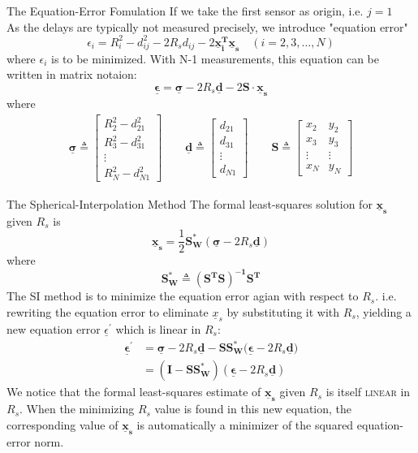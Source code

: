 \documentclass[10pt]{beamer}
\begin{document}
\begin{frame}{The Equation-Error Fomulation}
  If we take the first sensor as origin, i.e. $j=1$ \\
  As the delays are typically not measured precisely, we introduce "equation error"
  $$ \epsilon_{i} = R_{i}^2 - d_{ij}^2 -2R_{s}d_{ij} - 2\mathbf{\underline{x}_{i}^T \underline{x}_{s}} \quad (i=2,3,\ldots,N) $$
  where $\epsilon_{i}$ is to be minimized.
  With N-1 measurements, this equation can be written in matrix notaion:
  $$ \boldsymbol{\underline{\epsilon}} = \boldsymbol{\underline{\sigma}} - 2R_{s}\mathbf{\underline{d}} - 2 \mathbf{ S \cdot \underline{x}_{s}} $$
  where
  \begin{align*}
    \boldsymbol{\underline{\sigma}} \triangleq \begin{bmatrix} R_{2}^2 - d_{21}^2 \\ R_{3}^2 - d_{31}^2 \\ \vdots \\ R_{N}^2 - d_{N1}^2 \end{bmatrix} \qquad
    \mathbf{\underline{d}}      \triangleq \begin{bmatrix} d_{21}\\ d_{31} \\ \vdots \\ d_{N1} \end{bmatrix} \qquad
    \mathbf{S} \triangleq \begin{bmatrix} x_2 & y_2 \\x_3 & y_3\\ \vdots & \vdots \\ x_N & y_N \end{bmatrix}
  \end{align*}
\end{frame}
\begin{frame}{The Spherical-Interpolation Method}
  The formal least-squares solution for $\mathbf{\underline{x}_s}$ \alert{given} $R_s$ is
  $$ \mathbf{\underline{x}_s }= \frac{1}{2} \mathbf{S_W^*} (\boldsymbol{\underline{\sigma}} - 2R_s\mathbf{\underline{d}})$$
  where
  $$  \mathbf{S_W^* \triangleq (S^T S)^{-1}S^T} $$
  The \alert{SI} method is to minimize the equation error agian with respect to $R_s$.
  i.e. rewriting the equation error to eliminate $\underline{x}_s$ by substituting it with $R_s$, yielding a new equation error $\underline{\epsilon}^{'}$ which is linear in $R_s$:
  \begin{align*}
   \boldsymbol{\underline{\epsilon}^{'}} &= \boldsymbol{\underline{\sigma}} - 2R_s\mathbf{\underline{d} - S S^*_W (\boldsymbol{\underline{\epsilon}}} - 2R_s\mathbf{\underline{d}})\\
                            &= \mathbf{(I - S S_W^*)}(\boldsymbol{\underline{\epsilon}} - 2R_s\mathbf{\underline{d}})
  \end{align*}
  We notice that the formal least-squares estimate of  $\mathbf{\underline{x}_s}$ \alert{given} $R_s$ is itself \textsc{linear} in $R_s$. When the minimizing $R_s$ value is found
  in this new equation, the corresponding value of $\mathbf{\underline{x}_s}$ is automatically a minimizer of the squared equation-error norm.
\end{frame}
\end{document}
